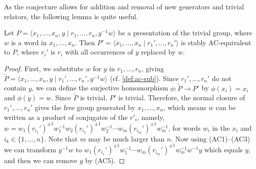 As the conjecture allows for addition and removal of new generators and trivial relators, the following lemma is quite useful.


\begin{lemma}\label{lem:substitution}
    Let $P=\langle x_1,\ldots, x_n, y \mid r_1,\ldots, r_n, y^{-1}w\rangle$ be a presentation of the trivial group, where $w$ is a word in $x_1,\ldots,x_n$. Then $P'=\langle x_1,\ldots, x_n \mid r_1',\ldots, r_n'\rangle$ is stably AC-equivalent to $P$, where $r_i'$ is $r_i$ with all occurrences of $y$ replaced by $w$.
\end{lemma}
\begin{proof}
    First, we substitute $w$ for $y$ in $r_1,\ldots,r_n$, giving $\widetilde{P}=\langle x_1,\ldots,x_n,y\mid r_1',\ldots,r_n',y^{-1}w\rangle$ (cf. \autoref{def:ac-sub}). Since $r_1',\ldots,r_n'$ do not contain $y$, we can define the surjective homomorphism $\phi:\widetilde{P}\longrightarrow P'$ by $\phi(x_i)=x_i$ and $\phi(y)=w$. Since $\widetilde{P}$ is trivial, $P'$ is trivial. Therefore, the normal closure of $r_1',\ldots, r_n'$ gives the free group generated by $x_1,\ldots, x_n$, which means $w$ can be written as a product of conjugates of the $r'_i$, namely, $w=w_1 (r_{i_1}')^{\pm1}w_1^{-1}w_2 (r_{i_2}')^{\pm 1}w_2^{-1}\cdots w_m (r_{i_m}')^{\pm 1}w_m^{-1}$, for words $w_i$ in the $x_i$ and $i_k \in \{1,\ldots,n\}$. Note that $m$ may be much larger than $n$. Now using (AC1)--(AC3) we can transform  $y^{-1}w$ to $w_1 (r_{i_1}')^{\pm1}w_1^{-1}\cdots w_m (r_{i_m}')^{\pm 1}w_m^{-1}w^{-1}y$ which equals $y$, and then we can remove $y$ by (AC5).
\end{proof}


